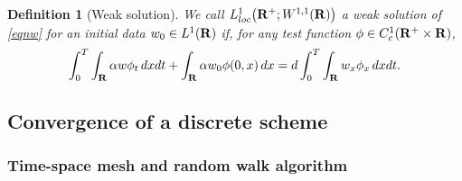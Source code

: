 \documentclass[11pt]{amsart}
\def\R{{\bf R}}
\def\R{\mathbb{R}}
\def\R{{\bf R}}
\newtheorem{definition}{Definition}[section]
\begin{document}
\begin{definition}[Weak solution] We call $L^1_{loc}\big(\R^+;W^{1,1}(\R)\big)$ a weak solution of
\eqref{eqnw} for an initial data $w_0 \in L^1(\R)$ if, for any test function $\phi \in
C_c^1(\R^+\times \R)$,
 \begin{equation}\label{DefWeak}
  \int_0^T\int_\R \alpha w\phi_t\,dxdt
  +\int_\R\alpha w_0\phi(0,x)\,dx = d\int_0^T\int_\R w_x\phi_x\, dxdt.
 \end{equation}
\end{definition}


\subsection{Convergence of a discrete scheme}

\subsubsection{Time-space mesh and random walk algorithm}
\end{document}
